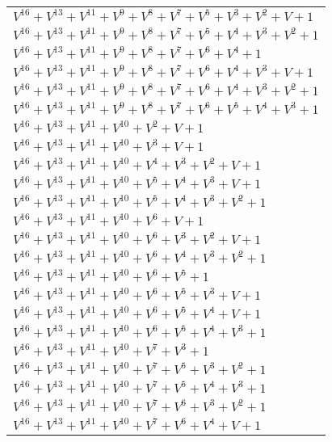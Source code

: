 \documentclass[12pt]{article}
\begin{document}
\begin{adjustwidth}{-4cm}{}
\begin{center}
\begin{longtable}{|l|}
$V^{16}  +V^{13}  +V^{11}  +V^{9}  +V^{8}  +V^{7}  +V^{5}  +V^{3}  +V^{2}  + V + 1$ \\
$V^{16}  +V^{13}  +V^{11}  +V^{9}  +V^{8}  +V^{7}  +V^{5}  +V^{4}  +V^{3}  +V^{2}  + 1$ \\
$V^{16}  +V^{13}  +V^{11}  +V^{9}  +V^{8}  +V^{7}  +V^{6}  +V^{4}  + 1$ \\
$V^{16}  +V^{13}  +V^{11}  +V^{9}  +V^{8}  +V^{7}  +V^{6}  +V^{4}  +V^{3}  + V + 1$ \\
$V^{16}  +V^{13}  +V^{11}  +V^{9}  +V^{8}  +V^{7}  +V^{6}  +V^{4}  +V^{3}  +V^{2}  + 1$ \\
$V^{16}  +V^{13}  +V^{11}  +V^{9}  +V^{8}  +V^{7}  +V^{6}  +V^{5}  +V^{4}  +V^{3}  + 1$ \\
$V^{16}  +V^{13}  +V^{11}  +V^{10}  +V^{2}  + V + 1$ \\
$V^{16}  +V^{13}  +V^{11}  +V^{10}  +V^{3}  + V + 1$ \\
$V^{16}  +V^{13}  +V^{11}  +V^{10}  +V^{4}  +V^{3}  +V^{2}  + V + 1$ \\
$V^{16}  +V^{13}  +V^{11}  +V^{10}  +V^{5}  +V^{4}  +V^{3}  + V + 1$ \\
$V^{16}  +V^{13}  +V^{11}  +V^{10}  +V^{5}  +V^{4}  +V^{3}  +V^{2}  + 1$ \\
$V^{16}  +V^{13}  +V^{11}  +V^{10}  +V^{6}  + V + 1$ \\
$V^{16}  +V^{13}  +V^{11}  +V^{10}  +V^{6}  +V^{3}  +V^{2}  + V + 1$ \\
$V^{16}  +V^{13}  +V^{11}  +V^{10}  +V^{6}  +V^{4}  +V^{3}  +V^{2}  + 1$ \\
$V^{16}  +V^{13}  +V^{11}  +V^{10}  +V^{6}  +V^{5}  + 1$ \\
$V^{16}  +V^{13}  +V^{11}  +V^{10}  +V^{6}  +V^{5}  +V^{3}  + V + 1$ \\
$V^{16}  +V^{13}  +V^{11}  +V^{10}  +V^{6}  +V^{5}  +V^{4}  + V + 1$ \\
$V^{16}  +V^{13}  +V^{11}  +V^{10}  +V^{6}  +V^{5}  +V^{4}  +V^{3}  + 1$ \\
$V^{16}  +V^{13}  +V^{11}  +V^{10}  +V^{7}  +V^{3}  + 1$ \\
$V^{16}  +V^{13}  +V^{11}  +V^{10}  +V^{7}  +V^{5}  +V^{3}  +V^{2}  + 1$ \\
$V^{16}  +V^{13}  +V^{11}  +V^{10}  +V^{7}  +V^{5}  +V^{4}  +V^{3}  + 1$ \\
$V^{16}  +V^{13}  +V^{11}  +V^{10}  +V^{7}  +V^{6}  +V^{3}  +V^{2}  + 1$ \\
$V^{16}  +V^{13}  +V^{11}  +V^{10}  +V^{7}  +V^{6}  +V^{4}  + V + 1$ \\

\end{longtable}
\end{center}
\end{adjustwidth}
\end{document}

